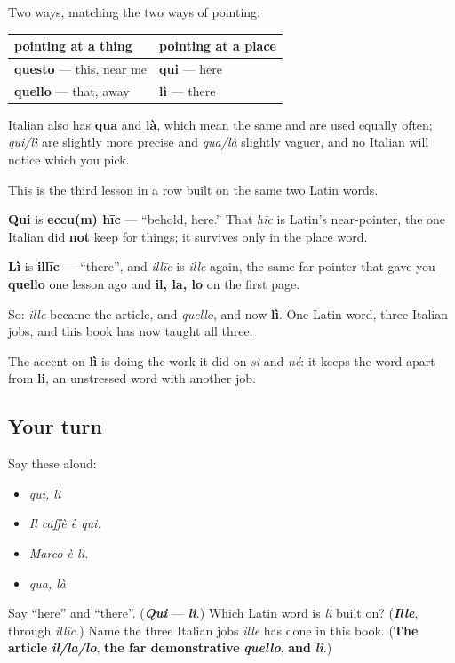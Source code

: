 Two ways, matching the two ways of pointing:

\noindent
\begin{tabularx}{\linewidth}{@{}>{\raggedright\arraybackslash}X>{\raggedright\arraybackslash}X@{}}
\toprule
\textbf{pointing at a thing} & \textbf{pointing at a place} \\
\midrule
\textbf{questo} — this, near me & \textbf{qui} — here \\
\textbf{quello} — that, away & \textbf{lì} — there \\
\bottomrule
\end{tabularx}

Italian also has \textbf{qua} and \textbf{là}, which mean the same and are used equally often; \emph{qui/lì} are slightly more precise and \emph{qua/là} slightly vaguer, and no Italian will notice which you pick.

\begin{cousinweb}
This is the third lesson in a row built on the same two Latin words.

\textbf{Qui} is \textbf{eccu(m) hīc} — \textquotedblleft{}behold, here.\textquotedblright{} That \emph{hīc} is Latin's near-pointer, the one Italian did \textbf{not} keep for things; it survives only in the place word.

\textbf{Lì} is \textbf{illīc} — \textquotedblleft{}there\textquotedblright{}, and \emph{illīc} is \emph{ille} again, the same far-pointer that gave you \textbf{quello} one lesson ago and \textbf{il, la, lo} on the first page.

So: \emph{ille} became the article, and \emph{quello}, and now \textbf{lì}. One Latin word, three Italian jobs, and this book has now taught all three.

The accent on \textbf{lì} is doing the work it did on \emph{sì} and \emph{né}: it keeps the word apart from \textbf{li}, an unstressed word with another job.
\end{cousinweb}

\subsection*{Your turn}
Say these aloud:

\begin{itemize}
\raggedright
  \item \emph{qui, lì}
  \item \emph{Il caffè è qui.}
  \item \emph{Marco è lì.}
  \item \emph{qua, là}
\end{itemize}

\begin{tcolorbox}[breakable,colback=teal!4,colframe=teal!35!black,title={Before you move on}]
Say \textquotedblleft{}here\textquotedblright{} and \textquotedblleft{}there\textquotedblright{}. (\emph{\textbf{Qui}} — \emph{\textbf{lì}}.) Which Latin word is \emph{lì} built on? (\emph{\textbf{Ille}}, through \emph{illīc}.) Name the three Italian jobs \emph{ille} has done in this book. (\textbf{The article} \emph{\textbf{il/la/lo}}, \textbf{the far demonstrative} \emph{\textbf{quello}}, \textbf{and} \emph{\textbf{lì}}.)
\end{tcolorbox}
